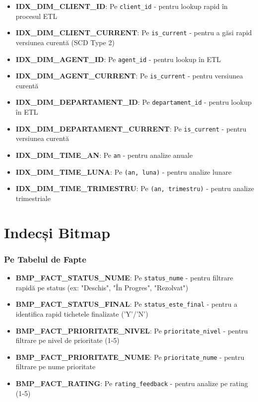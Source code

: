 \begin{itemize}
    \item \textbf{IDX\_DIM\_CLIENT\_ID}: Pe \texttt{client\_id} - pentru lookup rapid în procesul ETL
    \item \textbf{IDX\_DIM\_CLIENT\_CURRENT}: Pe \texttt{is\_current} - pentru a găsi rapid versiunea curentă (SCD Type 2)
    \item \textbf{IDX\_DIM\_AGENT\_ID}: Pe \texttt{agent\_id} - pentru lookup în ETL
    \item \textbf{IDX\_DIM\_AGENT\_CURRENT}: Pe \texttt{is\_current} - pentru versiunea curentă
    \item \textbf{IDX\_DIM\_DEPARTAMENT\_ID}: Pe \texttt{departament\_id} - pentru lookup în ETL
    \item \textbf{IDX\_DIM\_DEPARTAMENT\_CURRENT}: Pe \texttt{is\_current} - pentru versiunea curentă
    \item \textbf{IDX\_DIM\_TIME\_AN}: Pe \texttt{an} - pentru analize anuale
    \item \textbf{IDX\_DIM\_TIME\_LUNA}: Pe \texttt{(an, luna)} - pentru analize lunare
    \item \textbf{IDX\_DIM\_TIME\_TRIMESTRU}: Pe \texttt{(an, trimestru)} - pentru analize trimestriale
\end{itemize}

\section{Indecși Bitmap}


\subsubsection{Pe Tabelul de Fapte}

\begin{itemize}
    \item \textbf{BMP\_FACT\_STATUS\_NUME}: Pe \texttt{status\_nume} - pentru filtrare rapidă pe status (ex: "Deschis", "În Progres", "Rezolvat")
    \item \textbf{BMP\_FACT\_STATUS\_FINAL}: Pe \texttt{status\_este\_final} - pentru a identifica rapid tichetele finalizate ('Y'/'N')
    \item \textbf{BMP\_FACT\_PRIORITATE\_NIVEL}: Pe \texttt{prioritate\_nivel} - pentru filtrare pe nivel de prioritate (1-5)
    \item \textbf{BMP\_FACT\_PRIORITATE\_NUME}: Pe \texttt{prioritate\_nume} - pentru filtrare pe nume prioritate
    \item \textbf{BMP\_FACT\_RATING}: Pe \texttt{rating\_feedback} - pentru analize pe rating (1-5)
\end{itemize}

